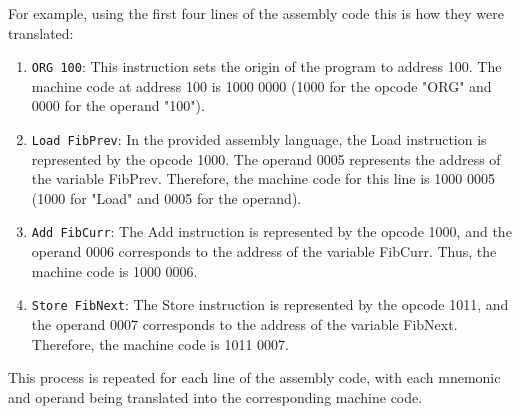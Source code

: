 \documentclass[12pt]{article}
\begin{document}
\noindent For example, using the first four lines of the assembly code this is how they were translated:
\begin{enumerate}
    \item \verb|ORG 100|: This instruction sets the origin of the program to address 100. The machine code at address 100 is 1000 0000 (1000 for the opcode "ORG" and 0000 for the operand "100").
    \item \verb|Load FibPrev|: In the provided assembly language, the Load instruction is represented by the opcode 1000. The operand 0005 represents the address of the variable FibPrev. Therefore, the machine code for this line is 1000 0005 (1000 for "Load" and 0005 for the operand).
    \item \verb|Add FibCurr|: The Add instruction is represented by the opcode 1000, and the operand 0006 corresponds to the address of the variable FibCurr. Thus, the machine code is 1000 0006.
    \item \verb|Store FibNext|: The Store instruction is represented by the opcode 1011, and the operand 0007 corresponds to the address of the variable FibNext. Therefore, the machine code is 1011 0007.
\end{enumerate}
This process is repeated for each line of the assembly code, with each mnemonic and operand being translated into the corresponding machine code.
\end{document}
